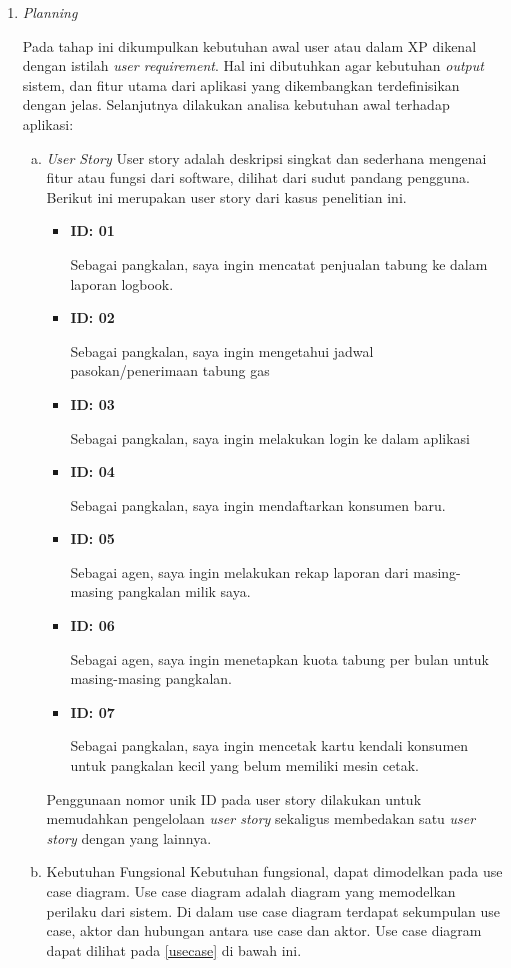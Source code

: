 \begin{enumerate}[1.]
	\item \emph {Planning}
	
	Pada tahap ini dikumpulkan kebutuhan awal user atau dalam XP dikenal dengan istilah \emph {user requirement}. Hal ini dibutuhkan agar kebutuhan \emph {output} sistem, dan fitur utama dari aplikasi yang dikembangkan terdefinisikan dengan jelas. Selanjutnya dilakukan analisa kebutuhan awal terhadap aplikasi:
	
	\begin{enumerate}[a.]
		\item \textit{User Story}
		User story adalah deskripsi singkat dan sederhana mengenai fitur atau fungsi dari software, dilihat dari sudut pandang pengguna. Berikut ini merupakan user story dari kasus penelitian ini.
		\begin{itemize}
			\item \textbf{ID: 01}
			\par Sebagai pangkalan, saya ingin mencatat penjualan tabung ke dalam laporan logbook.
			\item \textbf{ID: 02}
			\par Sebagai pangkalan, saya ingin mengetahui jadwal pasokan/penerimaan tabung gas
			\item \textbf{ID: 03}
			\par Sebagai pangkalan, saya ingin melakukan login ke dalam aplikasi
			\item \textbf{ID: 04}
			\par Sebagai pangkalan, saya ingin mendaftarkan konsumen baru.
			\item \textbf{ID: 05}
			\par Sebagai agen, saya ingin melakukan rekap laporan dari masing-masing pangkalan milik saya.
			\item \textbf{ID: 06}
			\par Sebagai agen, saya ingin menetapkan kuota tabung per bulan untuk masing-masing pangkalan.
			\item \textbf{ID: 07}
			\par Sebagai pangkalan, saya ingin mencetak kartu kendali konsumen untuk pangkalan kecil yang belum memiliki mesin cetak.
		\end{itemize}
		Penggunaan nomor unik ID pada user story dilakukan untuk memudahkan pengelolaan \textit{user story} sekaligus membedakan satu \textit{user story} dengan yang lainnya.
		
		\item Kebutuhan Fungsional
		\newline Kebutuhan fungsional, dapat dimodelkan pada use case diagram. Use case diagram adalah diagram yang memodelkan perilaku dari sistem. Di dalam use case diagram terdapat sekumpulan use case, aktor dan hubungan antara use case dan aktor. Use case diagram dapat dilihat pada \ref{usecase} di bawah ini.
		

\end{enumerate}
\end{enumerate}
